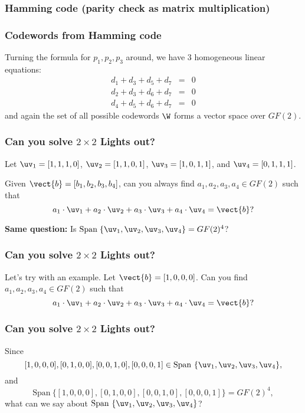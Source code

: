 \begin{frame}
  \frametitle{Hamming code (parity check as matrix multiplication)}
  

\end{frame}

\begin{frame}
  \frametitle{Codewords from Hamming code}

  Turning the formula for $p_1,p_2,p_3$ around, we have $3$
  homogeneous linear equations:
  \[
  \begin{array}{rcl}
    d_1 + d_3 + d_5 + d_7 &=& 0\\
    d_2 + d_3 + d_6 + d_7 &=& 0\\
    d_4 + d_5 + d_6 + d_7 &=& 0
  \end{array}
  \]
  and again the set of all possible codewords $\W$ forms a vector
  space over $GF(2)$.
  
\end{frame}



\begin{frame}
  \frametitle{Can you solve $2\times 2$ Lights out?}

  Let
  $\uv_1=[1,1,1,0]$, 
  $\uv_2=[1,1,0,1]$, 
  $\uv_3=[1,0,1,1]$, and 
  $\uv_4=[0,1,1,1]$.

  \vspace{0.2in}
  
  Given $\vect{b}=[b_1,b_2,b_3,b_4]$, can you always find
  $a_1,a_2,a_3,a_4\in GF(2)$ such that
  \[
  a_1\cdot \uv_1 + 
  a_2\cdot \uv_2 + 
  a_3\cdot \uv_3 + 
  a_4\cdot \uv_4 = \vect{b} ?
  \]

  \pause

  \vspace{0.2in}

  {\bf Same question:} Is $\mathrm{Span}\;\{\uv_1,\uv_2,\uv_3,\uv_4\} = GF(2)^4$?
\end{frame}


\begin{frame}
  \frametitle{Can you solve $2\times 2$ Lights out?}

  Let's try with an example.  Let $\vect{b}=[1,0,0,0]$.  Can you find
  $a_1,a_2,a_3,a_4\in GF(2)$ such that
  \[
  a_1\cdot \uv_1 + 
  a_2\cdot \uv_2 + 
  a_3\cdot \uv_3 + 
  a_4\cdot \uv_4 = \vect{b} ?
  \]

  \vspace{2in}

\end{frame}


\begin{frame}
  \frametitle{Can you solve $2\times 2$ Lights out?}

  Since
  \[
  [1,0,0,0], [0,1,0,0], [0,0,1,0], [0,0,0,1]\in {\mathrm{Span}}\ \{\uv_1,\uv_2,\uv_3,\uv_4\},
  \]
  and
  \pause
  \[
  \mathrm{Span}\ \{[1,0,0,0], [0,1,0,0], [0,0,1,0], [0,0,0,1]\} = GF(2)^4,
  \]
  \pause
  what can we say about ${\mathrm{Span}}\ \{\uv_1,\uv_2,\uv_3,\uv_4\}$?

\end{frame}


